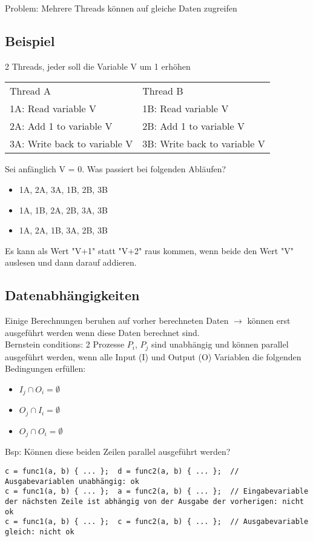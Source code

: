 Problem: Mehrere Threads können auf gleiche Daten zugreifen

\subsection{Beispiel} 2 Threads, jeder soll die Variable V um 1 erhöhen

\begin{tabular}{l l}
Thread A &
Thread B\\
1A: Read variable V &
1B: Read variable V\\
2A: Add 1 to variable V &
2B: Add 1 to variable V\\
3A: Write back to variable V &
3B: Write back to variable V\\
\end{tabular}
Sei anfänglich V = 0. Was passiert bei folgenden Abläufen?
\begin{itemize}
\item 1A, 2A, 3A, 1B, 2B, 3B
\item 1A, 1B, 2A, 2B, 3A, 3B
\item 1A, 2A, 1B, 3A, 2B, 3B
\end{itemize}
Es kann als Wert "V+1" statt "V+2" raus kommen, wenn beide den Wert "V" auslesen und dann darauf addieren.

\subsection{Datenabhängigkeiten}

Einige Berechnungen beruhen auf vorher berechneten Daten $\to$ können erst ausgeführt werden wenn diese Daten berechnet sind.\bigskip\\
Bernstein conditions: 2 Prozesse $P_i$, $P_j$ sind unabhängig und können parallel ausgeführt werden, wenn alle Input (I) und Output (O) Variablen die folgenden Bedingungen erfüllen:

\begin{itemize}
\item $I_j \cap O_i = \emptyset$
\item $O_j \cap I_i = \emptyset$
\item $O_j \cap O_i = \emptyset$
\end{itemize}
Bsp: Können diese beiden Zeilen parallel ausgeführt werden? 
\begin{lstlisting}[language={[Sharp]C}]
c = func1(a, b) { ... };  d = func2(a, b) { ... };	// Ausgabevariablen unabhängig: ok
c = func1(a, b) { ... };  a = func2(a, b) { ... };	// Eingabevariable der nächsten Zeile ist abhängig von der Ausgabe der vorherigen: nicht ok
c = func1(a, b) { ... };  c = func2(a, b) { ... };	// Ausgabevariable gleich: nicht ok
\end{lstlisting}

